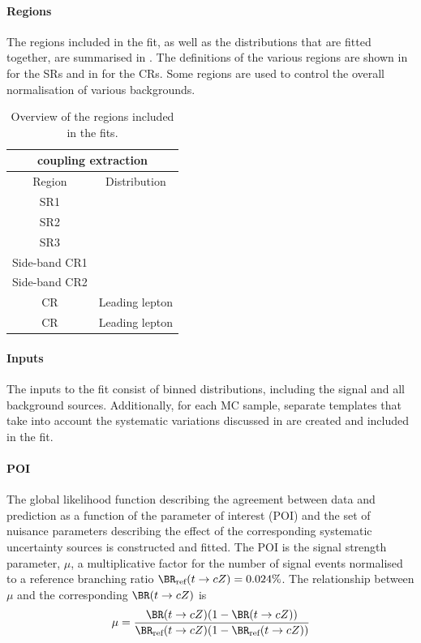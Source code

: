 \paragraph{Regions} The regions included in the fit, as well as the
distributions that are fitted together, are summarised in .
The definitions of the various regions are shown in
 for the SRs and in  for the CRs. 
Some regions are used to control the overall normalisation of various
backgrounds.

\begin{table}[htbp]
	\small
	\centering
	\begin{tabular}{cc}
		\toprule
		\multicolumn{2}{c}{\tZc coupling extraction} \\
		\midrule
		Region & Distribution \\
		\midrule
		SR1 \tZc & \Done  \\
		SR2 \tZc & \DtwoC  \\
		SR3 \tZc & \Dthree  \\
		Side-band CR1 \tZc & \Done  \\
		Side-band CR2 & \DtwoC  \\
		\ttZ CR & Leading lepton \pt  \\
		\ttbar CR & Leading lepton \pt  \\
		\bottomrule
	\end{tabular}
	\caption{
	Overview of the regions included in the fits.}%
\label{tab:fitregions}
\end{table}

\paragraph{Inputs} The inputs to the fit consist of binned
distributions, including the signal and all background sources.
Additionally, for each MC sample, separate templates that take into
account the systematic variations discussed in 
are created and included in the fit. 

\paragraph{POI} The global likelihood function describing the
agreement between data and prediction as a function of the parameter
of interest (POI) and the set of nuisance parameters describing the
effect of the corresponding systematic uncertainty sources is
constructed and fitted. The POI is the signal strength parameter, $\mu$,
a multiplicative factor for the number of signal events normalised to a reference branching ratio
$\BR_{\text{ref}}(t\rightarrow cZ)=0.024\%$.
The relationship between $\mu$ and the corresponding $\BR(t\rightarrow cZ)$ is
\begin{equation}
\mu=\frac{\BR(t\rightarrow cZ)(1-\BR(t\rightarrow cZ))}{\BR_{\text{ref}}(t\rightarrow cZ)(1-\BR_{\text{ref}}(t\rightarrow cZ))}
\end{equation}

